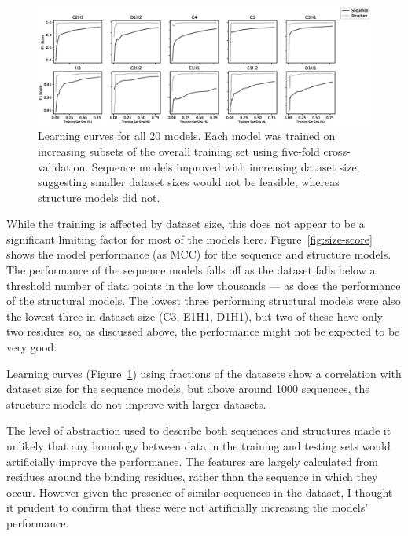 \begin{figure}
\centering
\includegraphics[width=1.0\textwidth]{Figures/learning-curve.eps}
\caption[Learning curves for all 20 models.]{\label{fig:learning-curves} Learning curves for all 20
  models. Each model was trained on increasing subsets of the overall
  training set using five-fold cross-validation. Sequence models
  improved with increasing dataset size, suggesting smaller dataset
  sizes would not be feasible, whereas structure models did not.}
\end{figure}

While the training is affected by dataset size, this does not appear to be a significant limiting factor for most of the models here. Figure~\ref{fig:size-score} shows the model performance (as MCC) for the sequence and structure models. The performance of the sequence models falls off as the dataset falls below a threshold number of data points in the low thousands --- as does the performance of the structural models. The lowest three performing structural models were also the lowest three in dataset size (C3, E1H1, D1H1), but two of these have only two residues so, as discussed above, the performance might not be expected to be very good.

Learning curves (Figure~\ref{fig:learning-curves}) using fractions of the datasets show a correlation with dataset size for the sequence models, but above around 1000 sequences, the structure models do not improve with larger datasets.

The level of abstraction used to describe both sequences and structures made it unlikely that any homology between data in the training and testing sets would artificially improve the performance. The features are largely calculated from residues around the binding residues, rather than the sequence in which they occur. However given the presence of similar sequences in the dataset, I thought it prudent to confirm that these were not artificially increasing the models' performance.

